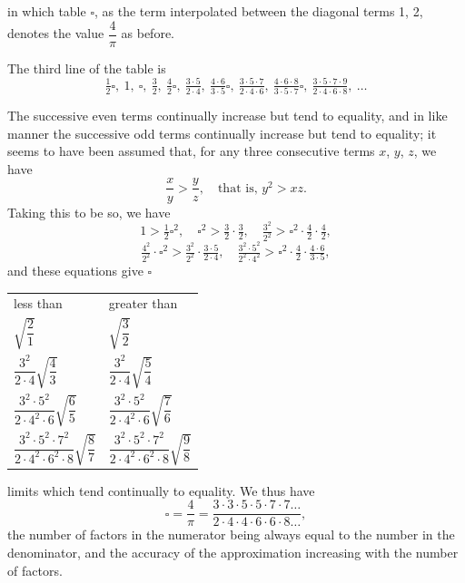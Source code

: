 \documentclass[11pt,a4paper]{article}
\begin{document}
\newpage

in which table $\square$, as the term interpolated between the diagonal terms 1, 2, denotes the value $\dfrac{4}{\pi}$ as before.

\smallskip
The third line of the table is
\[
\tfrac{1}{2}\square,\ 1,\ \square,\ \tfrac{3}{2},\ \tfrac{4}{2}\square,\ \tfrac{3\cdot 5}{2\cdot 4},\ \tfrac{4\cdot 6}{3\cdot 5}\square,\ \tfrac{3\cdot 5\cdot 7}{2\cdot 4\cdot 6},\ \tfrac{4\cdot 6\cdot 8}{3\cdot 5\cdot 7}\square,\ \tfrac{3\cdot 5\cdot 7\cdot 9}{2\cdot 4\cdot 6\cdot 8},\ \ldots
\]

The successive even terms continually increase but tend to equality, and in like manner the successive odd terms continually increase but tend to equality; it seems to have been assumed that, for any three consecutive terms $x$, $y$, $z$, we have
\[
\frac{x}{y} > \frac{y}{z}, \quad \text{that is, } y^2 > xz.
\]
Taking this to be so, we have
\[
1 > \tfrac{1}{2}\square^2,\quad \square^2 > \tfrac{3}{2}\cdot\tfrac{3}{2},\quad \tfrac{3^2}{2^2} > \square^2\cdot\tfrac{4}{2}\cdot\tfrac{4}{2},
\]
\[
\tfrac{4^2}{2^2}\cdot\square^2 > \tfrac{3^2}{2^2}\cdot\tfrac{3\cdot 5}{2\cdot 4},\quad \tfrac{3^2\cdot 5^2}{2^2\cdot 4^2} > \square^2\cdot\tfrac{4}{2}\cdot\tfrac{4\cdot 6}{3\cdot 5},
\]
and these equations give $\square$
\begin{center}
\begin{tabular}{ll}
less than & greater than \\
$\sqrt{\dfrac{2}{1}}$ & $\sqrt{\dfrac{3}{2}}$ \\[8pt]
$\dfrac{3^2}{2\cdot 4}\sqrt{\dfrac{4}{3}}$ & $\dfrac{3^2}{2\cdot 4}\sqrt{\dfrac{5}{4}}$ \\[8pt]
$\dfrac{3^2 \cdot 5^2}{2 \cdot 4^2 \cdot 6}\sqrt{\dfrac{6}{5}}$ & $\dfrac{3^2 \cdot 5^2}{2 \cdot 4^2 \cdot 6}\sqrt{\dfrac{7}{6}}$ \\[8pt]
$\dfrac{3^2 \cdot 5^2 \cdot 7^2}{2 \cdot 4^2 \cdot 6^2 \cdot 8}\sqrt{\dfrac{8}{7}}$ & $\dfrac{3^2 \cdot 5^2 \cdot 7^2}{2 \cdot 4^2 \cdot 6^2 \cdot 8}\sqrt{\dfrac{9}{8}}$ \\
\end{tabular}
\end{center}

\smallskip
limits which tend continually to equality. We thus have
\[
\square = \frac{4}{\pi} = \frac{3\cdot 3\cdot 5\cdot 5\cdot 7\cdot 7\ldots}{2\cdot 4\cdot 4\cdot 6\cdot 6\cdot 8\ldots},
\]
the number of factors in the numerator being always equal to the number in the denominator, and the accuracy of the approximation increasing with the number of factors.
\end{document}
